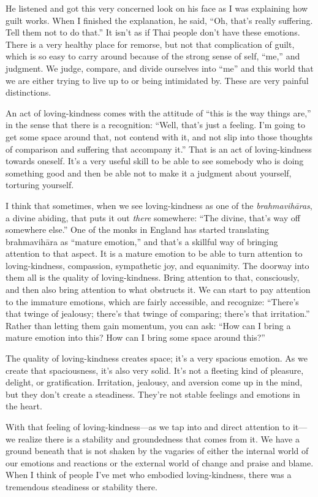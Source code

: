 He listened and got this very concerned look on his face as I was
explaining how guilt works. When I finished the explanation, he said,
“Oh, that’s really suffering. Tell them not to do that.” It isn’t as if
Thai people don’t have these emotions. There is a very healthy place for
remorse, but not that complication of guilt, which is so easy to carry
around because of the strong sense of self, “me,” and judgment. We
judge, compare, and divide ourselves into “me” and this world that we
are either trying to live up to or being intimidated by. These are very
painful distinctions.

An act of loving-kindness comes with the attitude of “this is the way
things are,” in the sense that there is a recognition: “Well, that’s
just a feeling. I’m going to get some space around that, not contend
with it, and not slip into those thoughts of comparison and suffering
that accompany it.” That is an act of loving-kindness towards oneself.
It’s a very useful skill to be able to see somebody who is doing
something good and then be able not to make it a judgment about
yourself, torturing yourself.

I think that sometimes, when we see loving-kindness as one of the
\emph{brahmavihāras}, a divine abiding, that puts it out \emph{there}
somewhere: “The divine, that’s way off somewhere else.” One of the monks
in England has started translating brahmavihāra as “mature emotion,” and
that’s a skillful way of bringing attention to that aspect. It is a
mature emotion to be able to turn attention to loving-kindness,
compassion, sympathetic joy, and equanimity. The doorway into them all
is the quality of loving-kindness. Bring attention to that, consciously,
and then also bring attention to what obstructs it. We can start to pay
attention to the immature emotions, which are fairly accessible, and
recognize: “There’s that twinge of jealousy; there’s that twinge of
comparing; there’s that irritation.” Rather than letting them gain
momentum, you can ask: “How can I bring a mature emotion into this? How
can I bring some space around this?”

The quality of loving-kindness creates space; it’s a very spacious
emotion. As we create that spaciousness, it’s also very solid. It’s not
a fleeting kind of pleasure, delight, or gratification. Irritation,
jealousy, and aversion come up in the mind, but they don’t create a
steadiness. They’re not stable feelings and emotions in the heart.

With that feeling of loving-kindness—as we tap into and direct attention
to it—we realize there is a stability and groundedness that comes from
it. We have a ground beneath that is not shaken by the vagaries of
either the internal world of our emotions and reactions or the external
world of change and praise and blame. When I think of people I’ve met
who embodied loving-kindness, there was a tremendous steadiness or
stability there.

